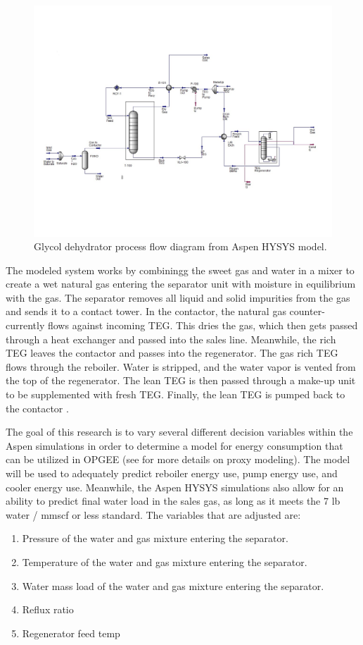 \documentclass[11pt]{report}
\begin{document}
\begin{figure}[t]
\includegraphics[width=1.1\columnwidth]{images/DehydrationPFD.pdf}
\caption{Glycol dehydrator process flow diagram from Aspen HYSYS model.}
\label{fig:dehyPFDaspen}
\end{figure}

The modeled system works by combiningg the sweet gas and water in a mixer to create a wet natural gas entering the separator unit with moisture in equilibrium with the gas. The separator removes all liquid and solid impurities from the gas and sends it to a contact tower. In the contactor, the natural gas counter-currently flows against incoming TEG. This dries the gas, which then gets passed through a heat exchanger and passed into the sales line. Meanwhile, the rich TEG leaves the contactor and passes into the regenerator. The gas rich TEG flows through the reboiler. Water is stripped, and the water vapor is vented from the top of the regenerator. The lean TEG is then passed through a make-up unit to be supplemented with fresh TEG. Finally, the lean TEG is pumped back to the contactor \cite{Manning1991}. 

The goal of this research is to vary several different decision variables within the Aspen simulations in order to determine a model for energy consumption that can be utilized in OPGEE (see \cite{Masnadi2020} for more details on proxy modeling). The model will be used to adequately predict reboiler energy use, pump energy use, and cooler energy use. Meanwhile, the Aspen HYSYS simulations also allow for an ability to predict final water load in the sales gas, as long as it meets the 7 lb water / mmscf or less standard. The variables that are adjusted are:
\begin{enumerate}
\item Pressure of the water and gas mixture entering the separator. 
\item Temperature of the water and gas mixture entering the separator.
\item Water mass load of the water and gas mixture entering the separator.
\item Reflux ratio
\item Regenerator feed temp
\end{enumerate}
\end{document}
